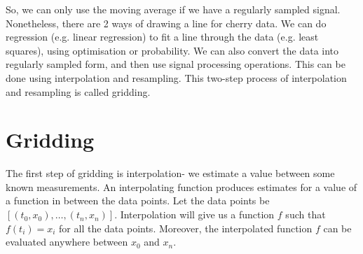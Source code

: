 \documentclass[a4paper, openany]{memoir}
\begin{document}
So, we can only use the moving average if we have a regularly sampled signal. Nonetheless, there are 2 ways of drawing a line for cherry data. We can do regression (e.g. linear regression) to fit a line through the data (e.g. least squares), using optimisation or probability. We can also convert the data into regularly sampled form, and then use signal processing operations. This can be done using interpolation and resampling. This two-step process of interpolation and resampling is called gridding.

\section{Gridding}
The first step of gridding is interpolation- we estimate a value between some known measurements. An interpolating function produces estimates for a value of a function in between the data points. Let the data points be $[(t_0, x_0), \dots, (t_n, x_n)]$. Interpolation will give us a function $f$ such that $f(t_i) = x_i$ for all the data points. Moreover, the interpolated function $f$ can be evaluated anywhere between $x_0$ and $x_n$.
\end{document}

